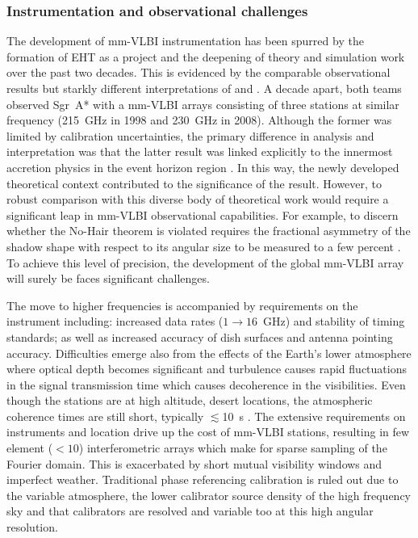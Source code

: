{\subsubsection{Instrumentation and observational challenges}\label{sec:eht_obs}
The development of mm-VLBI instrumentation has been spurred by the formation of EHT as a project and the deepening of theory and simulation work over the past two decades. This is evidenced by the comparable observational results but starkly different interpretations of \citet{Krichbaum_1998} and \citet{Doeleman_2008}. A decade apart, both teams observed Sgr~A* with a mm-VLBI arrays consisting of three stations at similar frequency (215~GHz in 1998 and 230~GHz in 2008). Although the former was limited by calibration uncertainties, the primary difference in analysis and interpretation was that the latter result was linked explicitly to the innermost accretion physics in the event horizon region \citep[e.g.][]{Broderick_2011}. In this way, the newly developed theoretical context contributed to the significance of the \citet{Doeleman_2008} result. However, to robust comparison with this diverse body of theoretical work would require a significant leap in mm-VLBI observational capabilities. For example, to discern whether the No-Hair theorem is violated requires the fractional asymmetry of the shadow shape with respect to its angular size to be measured to a few percent \citep[e.g.][and references therein]{Goddi_2016}. To achieve this level of precision, the development of the global mm-VLBI array will surely be faces significant challenges.


The move to higher frequencies is accompanied by requirements on the instrument including: increased data rates ($1 \to 16$~GHz) and stability of timing standards; as well as increased accuracy of dish surfaces and antenna pointing accuracy. Difficulties emerge also from the effects of the Earth's lower atmosphere where optical depth becomes significant and turbulence causes rapid fluctuations in the signal transmission time which causes decoherence in the visibilities. Even though the stations are at high altitude, desert locations, the atmospheric coherence times are still short, typically $\lesssim$10~s \citep{Doeleman_2009}. The extensive requirements on instruments and location drive up the cost of mm-VLBI stations, resulting in few element ($<10$) interferometric arrays which make for sparse sampling of the Fourier domain. This is exacerbated by short mutual visibility windows and imperfect weather. Traditional phase referencing calibration is ruled out due to the variable atmosphere, the lower calibrator source density of the high frequency sky and that calibrators are resolved and variable too at this high angular resolution. 


}
